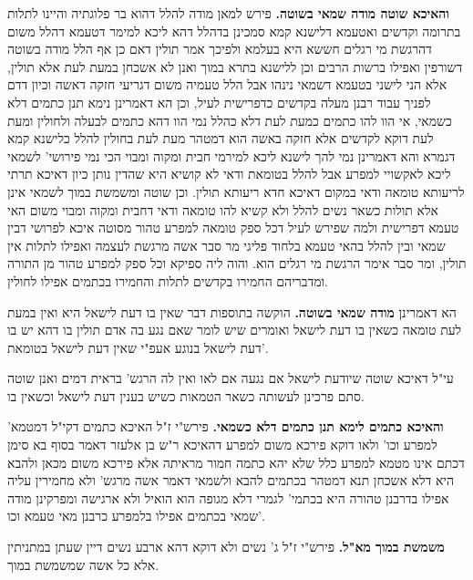 \documentclass[12pt, openany]{book}
\begin{document}
{\par\textbf{והאיכא שוטה מודה שמאי בשוטה.}  פירש למאן מודה להלל דהוא בר פלוגתיה והיינו לתלות בתרומה וקדשים ואטעמא דלישנא קמא סמכינן בדהלל דהא ליכא למימר דטעמא דהלל משום דהרגשת מי רגלים חששא היא בעלמא ולפיכך אמר תולין דאם כן אף הלל מודה בשוטה דשורפין ואפילו ברשות הרבים וכן ללישנא בתרא במוך ואנן לא אשכחן במעת לעת אלא תולין, אלא הני לישני בטעמא דשמאי נינהו אבל הלל טעמיה משום דגריעי חזקה דאשה וכיון דדם לפניך עבוד רבנן מעלה בקדשים כדפרישית לעיל, וכן הא דאמרינן נימא תנן כתמים דלא כשמאי, אי הוו להו כתמים כמעת לעת דלא כהלל נמי הוו דהא כתמים לבעלה ולחולין ומעת לעת דוקא לקדשים אלא חזקה באשה הוא דמטהר מעת לעת בחולין להלל כלישנא קמא דגמרא והא דאמרינן נמי להך לישנא ליכא למירמי חבית ומקוה ומבוי הכי נמי פירושי' לשמאי ליכא לאקשויי למפרע אבל להלל בטומאת ודאי לא קושיא היא שהדין נותן כיון דאיכא תרתי לריעותא טומאה ודאי במקום דאיכא חדא ריעותא תולין. וכן שוטה ומשמשת במוך לשמאי אינן אלא תולות כשאר נשים להלל ולא קשיא להו טומאה ודאי דחבית ומקוה ומבוי משום האי טעמא דפרישית ולמה שפירש לעיל דכל ספק טומאה למפרע טהור מסוטה איכא לפרושי דבין שמאי ובין להלל בהאי טעמא בלחוד פליגי מר סבר אשה מרגשת לעצמה ואפילו לתלות אין תולין, ומר סבר אימר הרגשת מי רגלים הוא. והוה ליה ספיקא וכל ספק למפרע טהור מן התורה ומדבריהם החמירו בקדשים לתלות והחמירו בכתמים אפילו לחולין. 
\par הא דאמרינן \textbf{מודה שמאי בשוטה.}  הוקשה בתוספות דבר שאין בו דעת לישאל היא ואין במעת לעת טומאה כשאין בו דעת לישאל ואומרים שיש לומר שאם נגע בה אדם תולין בו דהא יש בו דעת לישאל בנוגע אעפ"י שאין דעת לישאל בטומאת'.\par עי"ל דאיכא שוטה שיודעת לישאל אם נגעה אם לאו ואין לה הרגש' בראית דמים ואנן שוטה סתם פרכינן לעשותה כשאר הטמאות כשיש בענין דעת לישאל וכשאין בו. 
\par\textbf{והאיכא כתמים לימא תנן כתמים דלא כשמאי.}  פירש"י ז"ל האיכא כתמים דקי"ל דמטמא' למפרע וכו' ולאו דוקא פירכא משום למפרע דהאיכא ר"ש בן אלעזר דאמר בסוף בא סימן דכתם אינו מטמא למפרע כלל שלא יהא כתמה חמור מראיתה אלא פירכא משום מכאן ולהבא היא דלא אשכחן תנא דמטהר בכתמים להבא ולשמאי דאמר אשה מרגש' ולא מחמירין עליה אפילו בדרבנן טהורה היא בכתמי' לגמרי דלא מגופה הוא הואיל ולא ארגישה ומפרקינן מודה שמאי בכתמים אפילו בלמפרע כרבנן מאי טעמא וכו'. 
\par\textbf{משמשת במוך מא"ל.}  פירש"י ז"ל ג' נשים ולא דוקא דהא ארבע נשים דיין שעתן במתניתין אלא כל אשה שמשמשת במוך. 
\par}
\end{document}
